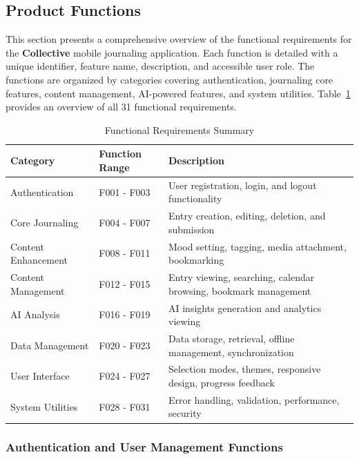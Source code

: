 \subsection{Product Functions}\label{subsec:productFunctions}

This section presents a comprehensive overview of the functional requirements for the \textbf{Collective} mobile journaling application. Each function is detailed with a unique identifier, feature name, description, and accessible user role. The functions are organized by categories covering authentication, journaling core features, content management, AI-powered features, and system utilities. Table~\ref{tab:function-summary} provides an overview of all 31 functional requirements.

\begin{table}[H]
\centering
\caption{Functional Requirements Summary}
\label{tab:function-summary}
\begin{tabular}{|p{2.5cm}|p{3cm}|p{7.5cm}|}
\hline
\textbf{Category} & \textbf{Function Range} & \textbf{Description} \\
\hline
Authentication & F001 - F003 & User registration, login, and logout functionality \\
\hline
Core Journaling & F004 - F007 & Entry creation, editing, deletion, and submission \\
\hline
Content Enhancement & F008 - F011 & Mood setting, tagging, media attachment, bookmarking \\
\hline
Content Management & F012 - F015 & Entry viewing, searching, calendar browsing, bookmark management \\
\hline
AI Analysis & F016 - F019 & AI insights generation and analytics viewing \\
\hline
Data Management & F020 - F023 & Data storage, retrieval, offline management, synchronization \\
\hline
User Interface & F024 - F027 & Selection modes, themes, responsive design, progress feedback \\
\hline
System Utilities & F028 - F031 & Error handling, validation, performance, security \\
\hline
\end{tabular}
\end{table}

\newpage

\subsubsection{Authentication and User Management Functions}

